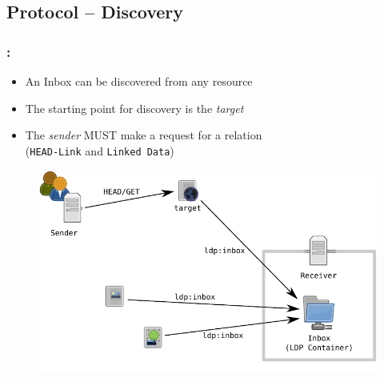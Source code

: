 \documentclass[aspectratio=169,hideallsubsections]{beamer}
\begin{document}
\subsection{Protocol – Discovery}
\begin{frame}
  \frametitle{\insertsection: \insertsubsection}%

  \begin{itemize}
   \item An Inbox can be discovered from any resource
   \item The starting point for discovery is the \textit{target}
   \item The \textit{sender} MUST make a request for a  relation\\(\texttt{HEAD-Link} and \texttt{Linked Data})
  \end{itemize}

  
    \begin{figure}
     \begin{center}
     \includegraphics[width=.4\textwidth]{LingedDataNotifications/LDN-overview-discovery}
     \end{center}
    \end{figure}

\end{frame}
\end{document}
